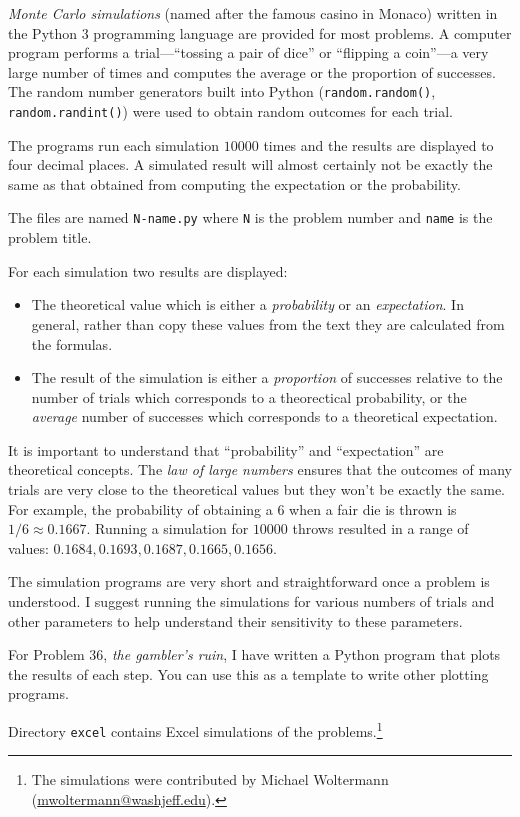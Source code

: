 
\bigskip

\emph{Monte Carlo simulations} (named after the famous casino in Monaco) written in the Python 3 programming language are provided for most problems. A computer program performs a trial---``tossing a pair of dice'' or ``flipping a coin''---a very large number of times and computes the average or the proportion of successes. The random number generators built into Python (\verb+random.random()+, \verb+random.randint()+) were used to obtain random outcomes for each trial.

The programs run each simulation $10000$ times and the results are displayed to four decimal places. A simulated result will almost certainly not be exactly the same as that obtained from computing the expectation or the probability.

The files are named \verb+N-name.py+ where \verb+N+ is the problem number and \verb+name+ is the problem title.

For each simulation two results are displayed: 
\begin{itemize}
\item The theoretical value which is either a \emph{probability} or an \emph{expectation}. In general, rather than copy these values from the text they are calculated from the formulas. 
\item The result of the simulation is either a \emph{proportion} of successes relative to the number of trials which corresponds to a theorectical probability, or the \emph{average} number of successes which corresponds to a theoretical expectation.
\end{itemize}
It is important to understand that ``probability'' and ``expectation'' are theoretical concepts. The \emph{law of large numbers} ensures that the outcomes of many trials are very close to the theoretical values but they won't be exactly the same. For example, the probability of obtaining a $6$ when a fair die is thrown is $1/6\approx 0.1667$. Running a simulation for $10000$ throws resulted in a range of values: $0.1684, 0.1693, 0.1687, 0.1665, 0.1656$.

The simulation programs are very short and straightforward once a problem is understood. I suggest running the simulations for various numbers of trials and other parameters to help understand their sensitivity to these parameters.

For Problem 36, \textit{the gambler's ruin}, I have written a Python program that plots the results of each step. You can use this as a template to write other plotting programs.

Directory \verb+excel+ contains Excel simulations of the problems.\footnote{The simulations were contributed by Michael Woltermann (\url{mwoltermann@washjeff.edu}).}
